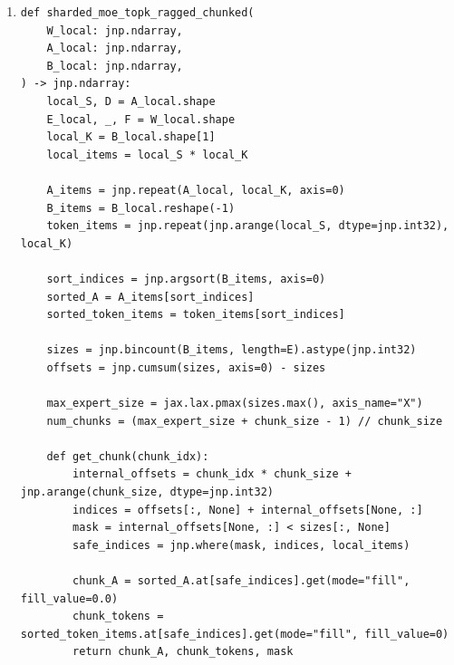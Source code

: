 \documentclass[11pt]{article}
\begin{document}
\begin{enumerate}
\begin{enumerate}[label=\arabic*.]
\begin{lstlisting}[style=pythoncode]
        internal_offsets = chunk_idx * chunk_size + jnp.arange(chunk_size, dtype=jnp.int32)
        indices = offsets[:, None] + internal_offsets[None, :]
        mask = internal_offsets[None, :] < sizes[:, None]

        indices = jnp.where(mask, indices, local_S)
        return output.at[indices.reshape(-1)].set(
            result.reshape(-1, F),
            mode="drop",
        )

    output = jnp.zeros((local_S, F), dtype=A_local.dtype)
    output = jax.lax.fori_loop(0, num_chunks, loop_body, output)

    return output[unsort_indices]
\end{lstlisting}

This leads to a roughly 2.5x speedup compared to the original solution.
\end{enumerate}

  \item
\begin{lstlisting}[style=pythoncode]
def sharded_moe_topk_ragged_chunked(
    W_local: jnp.ndarray,
    A_local: jnp.ndarray,
    B_local: jnp.ndarray,
) -> jnp.ndarray:
    local_S, D = A_local.shape
    E_local, _, F = W_local.shape
    local_K = B_local.shape[1]
    local_items = local_S * local_K

    A_items = jnp.repeat(A_local, local_K, axis=0)
    B_items = B_local.reshape(-1)
    token_items = jnp.repeat(jnp.arange(local_S, dtype=jnp.int32), local_K)

    sort_indices = jnp.argsort(B_items, axis=0)
    sorted_A = A_items[sort_indices]
    sorted_token_items = token_items[sort_indices]

    sizes = jnp.bincount(B_items, length=E).astype(jnp.int32)
    offsets = jnp.cumsum(sizes, axis=0) - sizes

    max_expert_size = jax.lax.pmax(sizes.max(), axis_name="X")
    num_chunks = (max_expert_size + chunk_size - 1) // chunk_size

    def get_chunk(chunk_idx):
        internal_offsets = chunk_idx * chunk_size + jnp.arange(chunk_size, dtype=jnp.int32)
        indices = offsets[:, None] + internal_offsets[None, :]
        mask = internal_offsets[None, :] < sizes[:, None]
        safe_indices = jnp.where(mask, indices, local_items)

        chunk_A = sorted_A.at[safe_indices].get(mode="fill", fill_value=0.0)
        chunk_tokens = sorted_token_items.at[safe_indices].get(mode="fill", fill_value=0)
        return chunk_A, chunk_tokens, mask


\end{lstlisting}
\end{enumerate}
\end{document}
